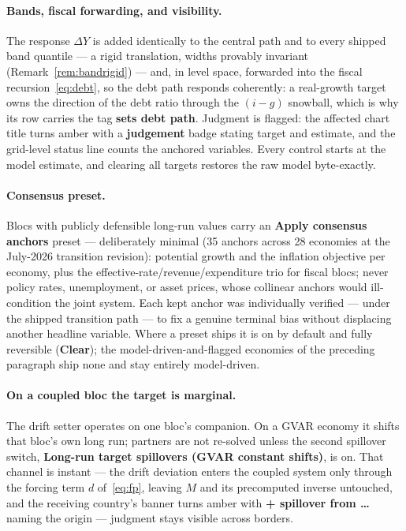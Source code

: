 \documentclass[11pt]{article}
\newcommand{\ui}[1]{\textbf{#1}}
\theoremstyle{plain}
\theoremstyle{remark}
\begin{document}
\paragraph{Bands, fiscal forwarding, and visibility.} The response
$\Delta Y$ is added identically to the central path and to every shipped
band quantile --- a rigid translation, widths provably invariant
(Remark~\ref{rem:bandrigid}) --- and, in level space, forwarded into the
fiscal recursion~\eqref{eq:debt}, so the debt path responds coherently:
a real-growth target owns the direction of the debt ratio through the
$(i-g)$ snowball, which is why its row carries the tag \ui{sets debt
path}. Judgment is flagged: the affected chart title turns amber with a
\ui{judgement} badge stating target and estimate, and the grid-level
status line counts the anchored variables. Every control starts at the
model estimate, and clearing all targets restores the raw model
byte-exactly.

\paragraph{Consensus preset.} Blocs with publicly defensible long-run
values carry an \ui{Apply consensus anchors} preset --- deliberately
minimal (35 anchors across 28 economies at the July-2026 transition
revision): potential growth and the inflation objective per economy, plus
the effective-rate/revenue/expenditure trio for fiscal blocs; never
policy rates, unemployment, or asset prices, whose collinear anchors would
ill-condition the joint system. Each kept anchor was individually
verified --- under the shipped transition path --- to fix a genuine
terminal bias without displacing another headline variable. Where a preset
ships it is on by default and fully reversible (\ui{Clear}); the
model-driven-and-flagged economies of the preceding paragraph ship none
and stay entirely model-driven.

\paragraph{On a coupled bloc the target is marginal.} The drift setter
operates on one bloc's companion. On a GVAR economy it shifts that
bloc's own long run; partners are not re-solved unless the second
spillover switch, \ui{Long-run target spillovers (GVAR constant
shifts)}, is on. That channel is instant --- the drift deviation enters
the coupled system only through the forcing term $d$
of~\eqref{eq:fp}, leaving $M$ and its precomputed inverse untouched, and
the receiving country's banner turns amber with
\ui{+ spillover from \dots} naming the origin --- judgment stays visible
across borders.\label{sec:driftgvar}
\end{document}
